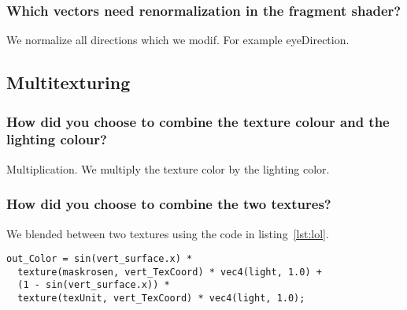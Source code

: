 \documentclass[a4paper,12pt]{article}
\begin{document}
\subsubsection{Which vectors need renormalization in the fragment shader? }
We normalize all directions which we modif. For example eyeDirection.


\subsection{Multitexturing}
\subsubsection{How did you choose to combine the texture colour and the lighting colour?}
Multiplication. We multiply the texture color by the lighting color.

\subsubsection{How did you choose to combine the two textures?}
We blended between two textures using the code in listing~\ref{lst:lol}.

\begin{lstlisting}[float,label=lst:lol,caption=Fragment shader]
out_Color = sin(vert_surface.x) *
  texture(maskrosen, vert_TexCoord) * vec4(light, 1.0) +
  (1 - sin(vert_surface.x)) *
  texture(texUnit, vert_TexCoord) * vec4(light, 1.0);
\end{lstlisting}
\end{document}
